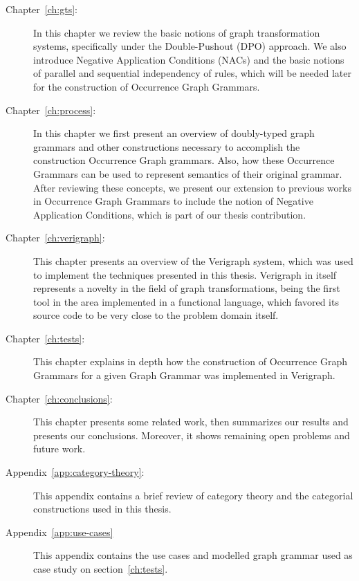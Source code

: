 \begin{description}
	\item[Chapter~\ref{ch:gts}:] In this chapter we review the basic notions of graph transformation systems, specifically under the Double-Pushout (DPO) approach. We also introduce Negative Application Conditions (NACs) and the basic notions of parallel and sequential independency of rules, which will be needed later for the construction of Occurrence Graph Grammars.

  \item[Chapter~\ref{ch:process}:] In this chapter we first present an overview of doubly-typed graph grammars and other constructions necessary to accomplish the construction Occurrence Graph grammars. Also, how these Occurrence Grammars can be used to represent semantics of their original grammar. After reviewing these concepts, we present our extension to previous works in Occurrence Graph Grammars to include the notion of Negative Application Conditions, which is part of our thesis contribution.

  \item[Chapter~\ref{ch:verigraph}:] This chapter presents an overview of the Verigraph system, which was used to implement the techniques presented in this thesis. Verigraph in itself represents a novelty in the field of graph transformations, being the first tool in the area implemented in a functional language, which favored its source code to be very close to the problem domain itself.

  \item[Chapter~\ref{ch:tests}:] This chapter explains in depth how the construction of Occurrence Graph Grammars for a given Graph Grammar was implemented in Verigraph.%

  \item[Chapter~\ref{ch:conclusions}:] This chapter presents some related work, then summarizes our results and presents our conclusions. Moreover, it shows remaining open problems and future work.

  \item[Appendix~\ref{app:category-theory}:] This appendix contains a brief review of category theory and the categorial constructions used in this thesis.

  \item[Appendix~\ref{app:use-cases}] This appendix contains the use cases and modelled graph grammar used as case study on section~\ref{ch:tests}.
\end{description}
